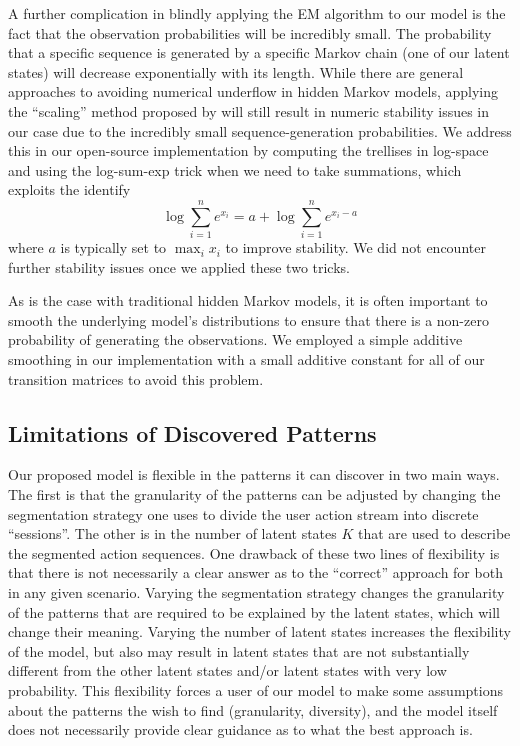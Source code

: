 A further complication in blindly applying the EM algorithm to our model is
the fact that the observation probabilities will be incredibly small. The
probability that a specific sequence is generated by a specific Markov
chain (one of our latent states) will decrease exponentially with its
length. While there are general approaches to avoiding numerical underflow
in hidden Markov models, applying the ``scaling'' method proposed by
\citet{Rabiner:1990:RSR} will still result in numeric stability issues in
our case due to the incredibly small sequence-generation probabilities. We
address this in our open-source implementation by computing the trellises
in log-space and using the log-sum-exp trick when we need to take
summations, which exploits the identify
\begin{equation}
    \log \sum_{i=1}^n e^{x_i} = a + \log \sum_{i=1}^n e^{x_i - a}
\end{equation}
where $a$ is typically set to $\max_i x_i$ to improve stability. We did not
encounter further stability issues once we applied these two tricks.

As is the case with traditional hidden Markov models, it is often important
to smooth the underlying model's distributions to ensure that there is a
non-zero probability of generating the observations. We employed a simple
additive smoothing in our implementation with a small additive constant for
all of our transition matrices to avoid this problem.

\subsection{Limitations of Discovered Patterns}

Our proposed model is flexible in the patterns it can discover in two main
ways. The first is that the granularity of the patterns can be adjusted by
changing the segmentation strategy one uses to divide the user action
stream into discrete ``sessions''. The other is in the number of latent
states $K$ that are used to describe the segmented action sequences. One
drawback of these two lines of flexibility is that there is not necessarily
a clear answer as to the ``correct'' approach for both in any given
scenario. Varying the segmentation strategy changes the granularity of the
patterns that are required to be explained by the latent states, which will
change their meaning. Varying the number of latent states increases the
flexibility of the model, but also may result in latent states that are not
substantially different from the other latent states and/or latent states
with very low probability. This flexibility forces a user of our model to
make some assumptions about the patterns the wish to find (granularity,
diversity), and the model itself does not necessarily provide clear
guidance as to what the best approach is.

